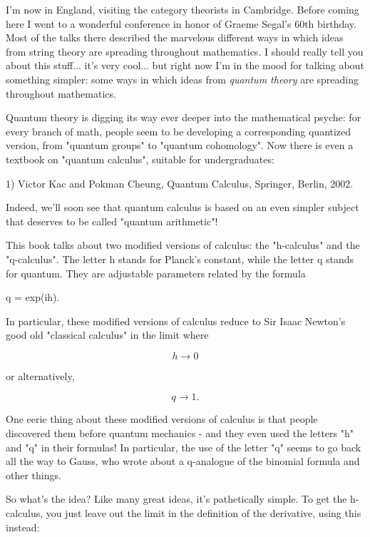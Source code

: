 

I'm now in England, visiting the category theorists in Cambridge.
Before coming here I went to a wonderful conference in honor of
Graeme Segal's 60th birthday.  Most of the talks there described 
the marvelous different ways in which ideas from string theory
are spreading throughout mathematics.  I should really tell you
about this stuff... it's very cool... but right now I'm in the
mood for talking about something simpler: some ways in which ideas
from \emph{quantum theory} are spreading throughout mathematics.

Quantum theory is digging its way ever deeper into the mathematical
psyche: for every branch of math, people seem to be developing a
corresponding quantized version, from "quantum groups" to
"quantum cohomology".  Now there is even a textbook on
"quantum calculus", suitable for undergraduates:

1) Victor Kac and Pokman Cheung, Quantum Calculus, Springer, Berlin, 2002.

Indeed, we'll soon see that quantum calculus is based on an even simpler
subject that deserves to be called "quantum arithmetic"!


This book talks about two modified versions of calculus: the
"h-calculus" and the "q-calculus".  The letter h
stands for Planck's constant, while the letter q stands for
quantum. They are adjustable parameters related by the formula

q = exp(ih).

In particular, these modified versions of calculus reduce to
Sir Isaac Newton's good old "classical calculus" in the limit where


$$

h \to  0
$$
    
or alternatively,


$$

q \to  1.
$$
    
One eerie thing about these modified versions of calculus is that people
discovered them before quantum mechanics - and they even used the
letters "h" and "q" in their formulas!  In
particular, the use of the letter "q" seems to go back all the
way to Gauss, who wrote about a q-analogue of the binomial formula and
other things.

So what's the idea?   Like many great ideas, it's pathetically simple. 
To get the h-calculus, you just leave out the limit in the definition of
the derivative, using this instead:


